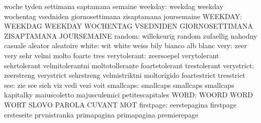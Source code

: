                            woche                     tyden
                           settimana                 saptamana
                           semaine
                  weekday: weekdag                   weekday
                           wochentag                 vsedniden
                           giornosettimana           zisaptamana
                           joursemaine
                  WEEKDAY: WEEKDAG                   WEEKDAY
                           WOCHENTAG                 VSEDNIDEN
                           GIORNOSETTIMANA           ZISAPTAMANA
                           JOURSEMAINE
                   random: willekeurig               random
                           zufaellig                 nahodny
                           casuale                   aleator
                           aleatoire
                    white: wit                       white
                           weiss                     bily
                           bianco                    alb
                           blanc
                     very: zeer                      very
                           sehr                      velmi
                           molto                     foarte
                           tres
             verytolerant: zeersoepel                verytolerant
                           sehrtolerant              velmitolerantni
                           moltotollerante           foartetolerant
                           trestolerant
               verystrict: zeerstreng                verystrict
                           sehrstreng                velmistriktni
                           moltorigido               foartestrict
                           tresstrict
                      see: zie                       see
                           sieh                      viz
                           vedi                      vezi
                           voit
                smallcaps: smallcaps                 smallcaps
                           smallcaps                 kapitalky
                           maiuscoletto              majusculemici
                           petitescapitales
                     WORD: WOORD                     WORD
                           WORT                      SLOVO
                           PAROLA                    CUVANT
                           MOT
                firstpage: eerstepagina              firstpage
                           ersteseite                prvnistranka
                           primapagina               primapagina
                           premierepage
